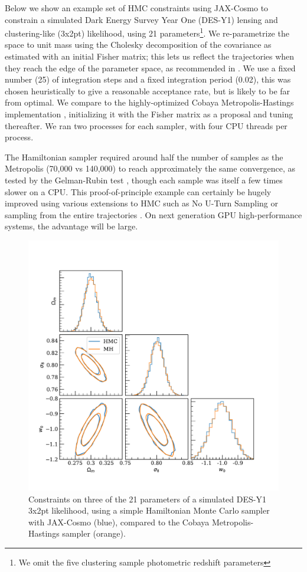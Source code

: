\documentclass[final,5p,times,twocolumn,authoryear]{elsarticle}
\begin{document}
Below we show an example set of HMC constraints using JAX-Cosmo to constrain a simulated
Dark Energy Survey Year One (DES-Y1) lensing and clustering-like (3x2pt) likelihood, using 21 parameters\footnote{We omit the 
five clustering sample photometric redshift parameters}.  We re-parametrize the space to unit mass using the Cholesky 
decomposition
of the covariance as estimated with an initial Fisher matrix; this lets us reflect the trajectories when they reach the
edge of the parameter space, as recommended in \citep{NIPS2015_8303a79b}.  We use a fixed number (25) of integration steps and 
a fixed integration period (0.02), this was chosen heuristically to give a reasonable acceptance rate, but is likely to be
far from optimal.  We compare to the highly-optimized {\sc Cobaya} 
Metropolis-Hastings implementation \citep{cobaya2,cobaya1}, initializing it with the Fisher matrix as a proposal and
tuning thereafter.  We ran two processes for each sampler, with four CPU threads per process.

The Hamiltonian sampler required around half the number of samples as the Metropolis (70,000 vs 140,000) to reach approximately the same
convergence, as tested by the Gelman-Rubin test \citep{gelman}, though each sample was itself a few times slower
on a CPU.  This proof-of-principle example can certainly be hugely improved using various extensions to HMC such as No U-Turn Sampling \citep{nuts} or sampling from the entire trajectories \cite{betancourt}.  On next generation GPU high-performance systems, the advantage will be large.

\begin{figure}
\includegraphics[width=0.95\columnwidth]{figures/hmc.pdf}
\caption{Constraints on three of the 21 parameters of a simulated DES-Y1 3x2pt likelihood, using a simple Hamiltonian
Monte Carlo sampler with JAX-Cosmo (blue), compared to the Cobaya Metropolis-Hastings sampler (orange).}
\end{figure}
\end{document}
